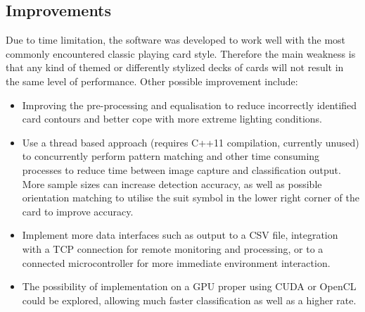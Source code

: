 \documentclass[a4paper,12pt,notitlepage]{article}
\begin{document}
	\subsection{Improvements}
		\label{sec:improvements}
		Due to time limitation, the software was developed to work well with the most commonly encountered classic playing card style. Therefore the main weakness is that any kind of themed or differently stylized decks of cards will not result in the same level of performance. Other possible improvement include:
		\begin{itemize}
			\item Improving the pre-processing and equalisation to reduce incorrectly identified card contours and better cope with more extreme lighting conditions.
			\item Use a thread based approach (requires C++11 compilation, currently unused) to concurrently perform pattern matching and other time consuming processes to reduce time between image capture and classification output. More sample sizes can increase detection accuracy, as well as possible orientation matching to utilise the suit symbol in the lower right corner of the card to improve accuracy.
			\item Implement more data interfaces such as output to a CSV file, integration with a TCP connection for remote monitoring and processing, or to a connected microcontroller for more immediate environment interaction. 
			\item The possibility of implementation on a GPU proper using CUDA or OpenCL could be explored, allowing much faster classification as well as a higher rate.
		\end{itemize}
\pagebreak
\thispagestyle{empty}
\printbibliography
\pagebreak
\end{document}
